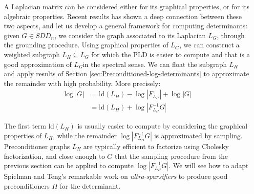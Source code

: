 A Laplacian matrix can be considered either for its graphical properties,
or for its algebraic properties. Recent results has shown a deep connection
between these two aspects, and let us develop a general framework
for computing determinants: given $G\in SDD_{n}$, we consider the
graph associated to its Laplacian $L_{G}$, through the grounding
procedure. Using graphical properties of $L_{G}$, we can construct
a weighted subgraph $L_{H}\subseteq L_{G}$ for which the PLD is easier
to compute and that is a good approximation of $L_{G}$in the spectral
sense. We can float the subgraph $L_{H}$ and apply results of Section
\ref{sec:Preconditioned-log-determinants} to approximate the remainder
with high probability. More precisely: 
\begin{align*}
\log\left|G\right| & =\text{ld}\left(L_{H}\right)-\log\left|F_{L_{H}}\right|+\log\left|G\right|\\
 & =\text{ld}\left(L_{H}\right)+\log\left|F_{L_{H}}^{-1}G\right|
\end{align*}


The first term $\text{ld}\left(L_{H}\right)$ is usually easier to
compute by considering the graphical properties of $L_{H}$, while
the remainder $\log\left|F_{L_{H}}^{-1}G\right|$ is approximated
by sampling. Preconditioner graphs $L_{H}$ are typically efficient
to factorize using Cholesky factorization, and close enough to $G$
that the sampling procedure from the previous section can be applied
to compute $\log\left|F_{L_{H}}^{-1}G\right|$. We will see how to
adapt Spielman and Teng's remarkable work on \emph{ultra-sparsifiers}
to produce good preconditioners $H$ for the determinant. 


